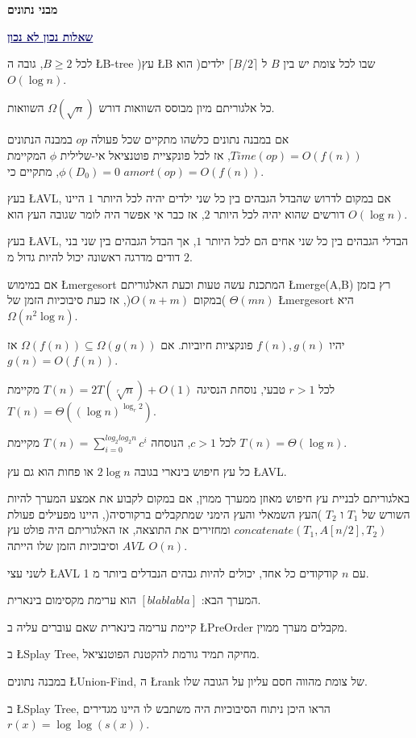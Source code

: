 \documentclass[12pt,a4paper]{article}
\newcommand{\bluetitle}[1]{\par \bigskip \begingroup \textcolor{MidnightBlue}{\Large{\textbf{\underline{#1}}}}\endgroup \par \bigskip}
\newcommand{\coursename}{מבני נתונים}
\begin{document}
 

\pagestyle{fancy}
\fancyhead{}
\renewcommand{\headrulewidth}{0cm}
\fancyfoot{}
\fancyfoot[RE,RO]{\thepage}
\begingroup 
\color{BrickRed}
\centering
  \huge \textbf{\coursename}\\[0.1cm]
\endgroup

\bluetitle{שאלות נכון לא נכון}
\begin{questions}
\item לכל $B \geq 2$, גובה ה \L{B-tree} )עץ \L{B} שבו לכל צומת יש בין $B$ ל $\lceil B/2 \rceil$ ילדים( הוא $O( \log n ) $.
\item כל אלגוריתם מיון מבוסס השוואות דורש $\Omega( \sqrt{n} )$ השוואות.
\item אם במבנה נתונים כלשהו מתקיים שכל פעולה $op$ במבנה הנתונים $Time(op) = O(f(n) )$, אז לכל פונקציית פוטנציאל אי-שלילית $\phi$ המקיימת $\phi(D_0 ) = 0$, מתקיים כי $amort( op ) = O( f(n) )$.
\item בעץ \L{AVL}, אם במקום לדרוש שהבדל הגבהים בין כל שני ילדים יהיה לכל היותר $1$ היינו דורשים שהוא יהיה לכל היותר $2$, אז כבר אי אפשר היה לומר שגובה העץ הוא $O( \log n )$.
\item בעץ \L{AVL}, הבדלי הגבהים בין כל שני אחים הם לכל היותר $1$, אך הבדל הגבהים בין שני בני דודים מדרגה ראשונה יכול להיות גדול מ $2$.
\item אם במימוש \L{mergesort} המתכנת עשה טעות וכעת האלגוריתם \L{merge(A,B)} רץ בזמן $\Theta( mn )$ )במקום $O(n+m)$(, אז כעת סיבוכיות הזמן של \L{mergesort} היא $\Omega(n^2 \log n)$.
\item יהיו $f(n), g(n)$ פונקציות חיוביות. אם $\Omega( f(n) ) \subseteq \Omega( g(n) )$ אז $g(n) = O( f(n) )$.
\item לכל $r>1$ טבעי, נוסחת הנסיגה $T(n) = 2T( \sqrt[r]{n} ) + O(1)$ מקיימת $T(n) = \Theta( (\log n) ^ {\log_r 2} )$.
\item לכל $c>1$, הנוסחה $T(n) = \sum\limits_{i=0}^{log_2 log_2 n } c^i$ מקיימת $T(n) = \Theta( \log n )$.
\item כל עץ חיפוש בינארי בגובה $2 \log n$ או פחות הוא גם עץ \L{AVL}.
\item באלגוריתם לבניית עץ חיפוש מאוזן ממערך ממוין, אם במקום לקבוע את אמצע המערך להיות השורש של $T_1$ ו $T_2$ )העץ השמאלי והעץ הימני שמתקבלים ברקורסיה(, היינו מפעילים פעולת $concatenate(T_1 , A[n/2] , T_2 )$ ומחזירים את התוצאה, אז האלגוריתם היה פולט עץ $AVL$ וסיבוכיות הזמן שלו הייתה $O(n)$.
\item לשני עצי \L{AVL} עם $n$ קודקודים כל אחד, יכולים להיות גבהים הנבדלים ביותר מ 1.
\item המערך הבא: $[blablabla]$ הוא ערימת מקסימום בינארית.
\item קיימת ערימה בינארית שאם עוברים עליה ב \L{PreOrder} מקבלים מערך ממוין.
\item ב \L{Splay Tree}, מחיקה תמיד גורמת להקטנת הפוטנציאל.
\item במבנה נתונים \L{Union-Find}, ה \L{rank} של צומת מהווה חסם עליון על הגובה שלו.
\item ב \L{Splay Tree}, הראו היכן ניתוח הסיבוכיות היה משתבש לו היינו מגדירים $r(x) = \log \log (s(x) )$.
\end{questions}
\end{document}
